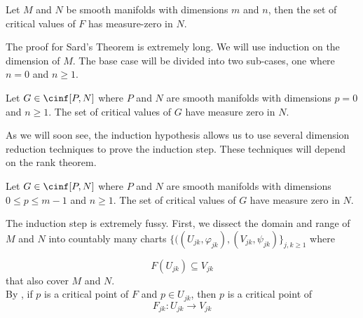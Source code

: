 \documentclass[../main-v2-manifolds.tex]{subfiles}
\begin{document}

\begin{wts}
    Let $M$ and $N$ be smooth manifolds with dimensions $m$ and $n$, then the set of critical values of $F$ has measure-zero in $N$.
\end{wts}
The proof for Sard's Theorem is extremely long. We will use induction on the dimension of $M$. The base case will be divided into two sub-cases, one where $n=0$ and $n\geq 1$.\\


\begin{step}[Base case: $m = 0$]
    Let $G\in\cinf[P,N]$ where $P$ and $N$ are smooth manifolds with dimensions $p = 0$ and $n\geq 1$. The set of critical values of $G$ have measure zero in $N$.
\end{step}


As we will soon see, the induction hypothesis allows  us to use several dimension reduction techniques to prove the induction step. These techniques will depend on the rank theorem.
\begin{step}
    Let $G\in\cinf[P,N]$ where $P$ and $N$ are smooth manifolds with dimensions $0\leq p\leq m-1$ and $n\geq 1$. The set of critical values of $G$ have measure zero in $N$.
\end{step}

The induction step is extremely fussy. First, we dissect the domain and range of $M$ and $N$ into countably many charts $\{((U_{jk}, \varphi_{jk}),(V_{jk},\psi_{jk})\}_{j,k\geq 1}$ where

\begin{equation}\label{lee-sards-Ujk-Vjk-spec}
    F(U_{jk})\subseteq V_{jk}    
\end{equation}
that also cover $M$ and $N$. \\

By , if $p$ is a critical point of $F$ and $p\in U_{jk}$, then $p$ is a critical point of 
\begin{equation}\label{lee-sards-Fjk-spec}
    F_{jk}: U_{jk}\to V_{jk}
\end{equation}
\end{document}
